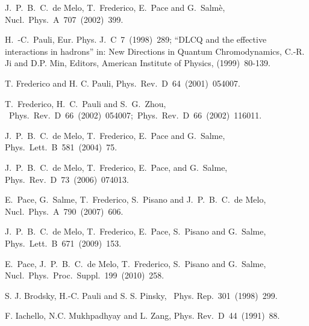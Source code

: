 \documentclass[preprint,aps,showpacs,floatfix]{revtex4}
\begin{document}
\begin{thebibliography}{99}
       
  J.~P.~B.~C.~de Melo, T.~Frederico, E.~Pace and G.~Salm\`e,
  Nucl.~Phys.~A~707~(2002)~399.
  

 H.~-C.~Pauli, 
Eur. Phys. J.~C~7~(1998)~289;
``DLCQ and the effective interactions in hadrons'' in: New Directions in
Quantum Chromodynamics, C.-R. Ji and D.P. Min, Editors, American Institute
of Physics, (1999)~80-139.


T. Frederico and H. C. Pauli,
Phys.~Rev.~D~64~(2001)~054007.


 T.~Frederico, H.~C.~Pauli and S.~G.~Zhou,
~Phys.~Rev.~D~66~(2002)~054007;~Phys.~Rev.~D~66~(2002)~116011.


  J.~P.~B.~C.~de Melo, T.~Frederico, E.~Pace and G.~Salme,
  Phys.~Lett.~B~581~(2004)~75. %
  
  
  J.~P.~B.~C.~de Melo, T.~Frederico, E.~Pace, and G.~Salme,
  Phys.\ Rev.\ D~73~(2006)~074013. %
  
  
  E.~Pace, G.~Salme, T.~Frederico, S.~Pisano and J.~P.~B.~C.~de Melo,
  Nucl.~Phys.~A~790~(2007)~606. %

  J.~P.~B.~C.~de Melo, T.~Frederico, E.~Pace, S.~Pisano and G.~Salme,
  Phys.~Lett.~B~671~(2009)~153.  %
  
 
  E.~Pace, J.~P.~B.~C.~de Melo, T.~Frederico, S.~Pisano and G.~Salme,
  Nucl.~Phys.~Proc.~Suppl.~199~(2010)~258. %
  
S. J. Brodsky, H.-C. Pauli and S. S. Pinsky,
~Phys. Rep.~301~(1998)~299.

 F. Iachello, N.C. Mukhpadhyay and L. Zang,
 Phys. Rev.~D~44~(1991)~88.


\end{thebibliography}
\end{document}
